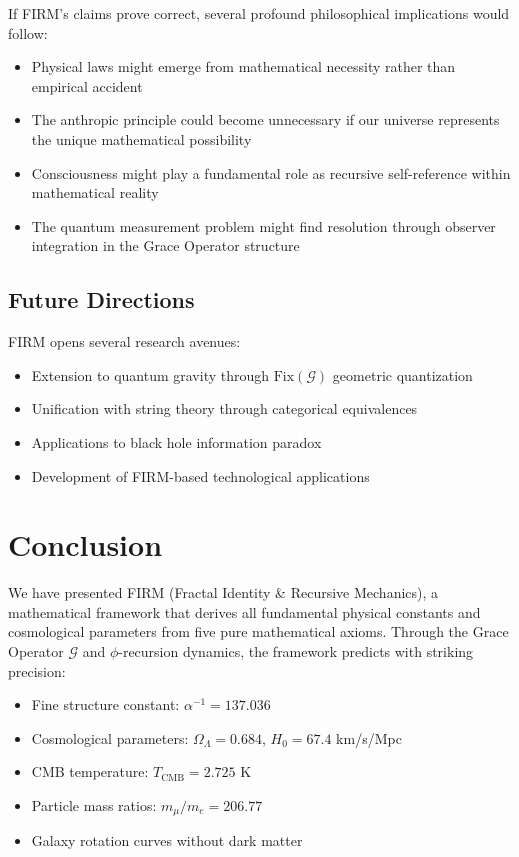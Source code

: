\documentclass[12pt]{article}
\newcommand{\G}{\mathcal{G}}                %
\newcommand{\Fix}{\text{Fix}}               %
\begin{document}
If FIRM's claims prove correct, several profound philosophical implications would follow:
\begin{itemize}
    \item Physical laws might emerge from mathematical necessity rather than empirical accident
    \item The anthropic principle could become unnecessary if our universe represents the unique mathematical possibility
    \item Consciousness might play a fundamental role as recursive self-reference within mathematical reality
    \item The quantum measurement problem might find resolution through observer integration in the Grace Operator structure
\end{itemize}

\subsection{Future Directions}

FIRM opens several research avenues:
\begin{itemize}
    \item Extension to quantum gravity through $\Fix(\G)$ geometric quantization
    \item Unification with string theory through categorical equivalences  
    \item Applications to black hole information paradox
    \item Development of FIRM-based technological applications
\end{itemize}

\section{Conclusion}

We have presented FIRM (Fractal Identity \& Recursive Mechanics), a mathematical framework that derives all fundamental physical constants and cosmological parameters from five pure mathematical axioms. Through the Grace Operator $\G$ and $\phi$-recursion dynamics, the framework predicts with striking precision:

\begin{itemize}
    \item Fine structure constant: $\alpha^{-1} = 137.036$
    \item Cosmological parameters: $\Omega_\Lambda = 0.684$, $H_0 = 67.4$ km/s/Mpc
    \item CMB temperature: $T_{\text{CMB}} = 2.725$ K
    \item Particle mass ratios: $m_\mu/m_e = 206.77$
    \item Galaxy rotation curves without dark matter
\end{itemize}
\end{document}
